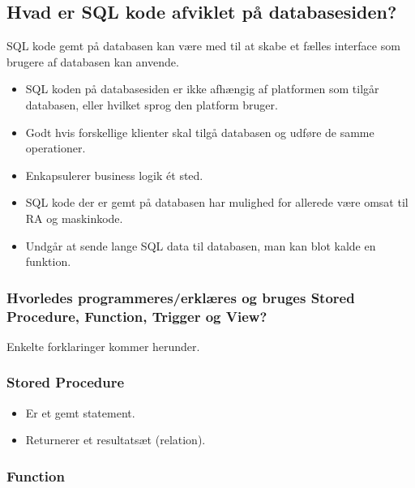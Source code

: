 \newpage

\subsection{Hvad er SQL kode afviklet på databasesiden?}

SQL	kode gemt på databasen kan være	med	til	at skabe et	fælles interface som	brugere	af databasen kan anvende.

\begin{itemize}
	\item SQL koden	på databasesiden er	ikke afhængig af platformen	som	tilgår	databasen, eller hvilket sprog den platform	bruger.
	\item Godt hvis forskellige klienter skal tilgå databasen og udføre de samme operationer.
	\item Enkapsulerer business logik ét sted.
	\item SQL kode der er gemt på databasen	har	mulighed for allerede være omsat til	RA og maskinkode.
	\item Undgår at	sende lange	SQL	data til databasen,	man	kan	blot kalde en	funktion.
\end{itemize}

\subsubsection{Hvorledes programmeres/erklæres og bruges Stored Procedure, Function, Trigger og View?}
Enkelte forklaringer kommer herunder.

\subsubsection{Stored Procedure}

\begin{itemize}
	\item Er et gemt statement.
	\item Returnerer et resultatsæt (relation).
\end{itemize}

\subsubsection{Function}

